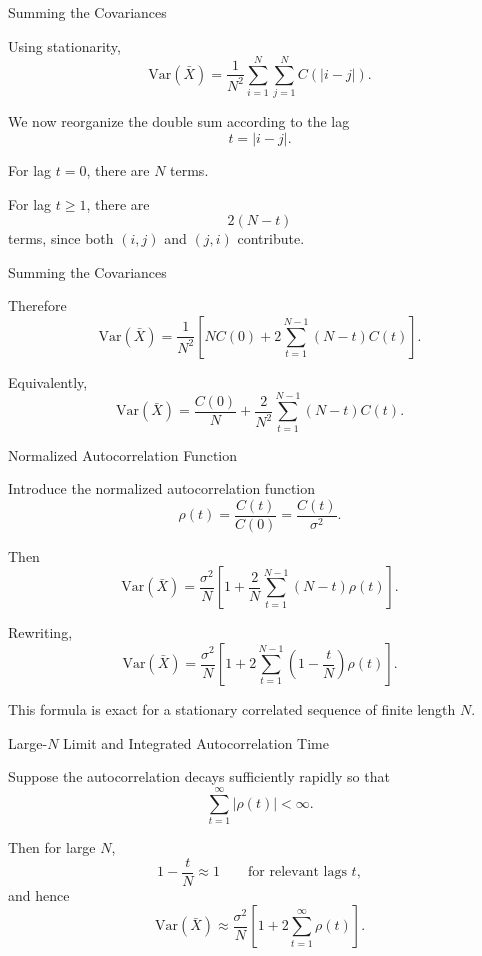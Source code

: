 \documentclass{beamer}
\begin{document}
\begin{frame}{Summing the Covariances}

Using stationarity,
\[
\mathrm{Var}(\bar X)
=
\frac{1}{N^2}\sum_{i=1}^N\sum_{j=1}^N C(|i-j|).
\]

We now reorganize the double sum according to the lag
\[
t = |i-j|.
\]

For lag $t=0$, there are $N$ terms.

For lag $t\ge 1$, there are
\[
2(N-t)
\]
terms, since both $(i,j)$ and $(j,i)$ contribute.


\end{frame}


\begin{frame}{Summing the Covariances}



Therefore
\[
\mathrm{Var}(\bar X)
=
\frac{1}{N^2}
\left[
N C(0) + 2\sum_{t=1}^{N-1}(N-t)C(t)
\right].
\]

Equivalently,
\[
\mathrm{Var}(\bar X)
=
\frac{C(0)}{N}
+
\frac{2}{N^2}\sum_{t=1}^{N-1}(N-t)C(t).
\]
\end{frame}



\begin{frame}{Normalized Autocorrelation Function}

Introduce the normalized autocorrelation function
\[
\rho(t)=\frac{C(t)}{C(0)}=\frac{C(t)}{\sigma^2}.
\]

Then
\[
\mathrm{Var}(\bar X)
=
\frac{\sigma^2}{N}
\left[
1+\frac{2}{N}\sum_{t=1}^{N-1}(N-t)\rho(t)
\right].
\]

Rewriting,
\[
\mathrm{Var}(\bar X)
=
\frac{\sigma^2}{N}
\left[
1+2\sum_{t=1}^{N-1}\left(1-\frac{t}{N}\right)\rho(t)
\right].
\]

This formula is exact for a stationary correlated sequence of finite length $N$.
\end{frame}

\begin{frame}{Large-$N$ Limit and Integrated Autocorrelation Time}

Suppose the autocorrelation decays sufficiently rapidly so that
\[
\sum_{t=1}^{\infty} |\rho(t)| < \infty.
\]

Then for large $N$,
\[
1-\frac{t}{N}\approx 1
\qquad
\text{for relevant lags } t,
\]
and hence
\[
\mathrm{Var}(\bar X)
\approx
\frac{\sigma^2}{N}
\left[
1+2\sum_{t=1}^{\infty}\rho(t)
\right].
\]


\end{frame}
\end{document}
